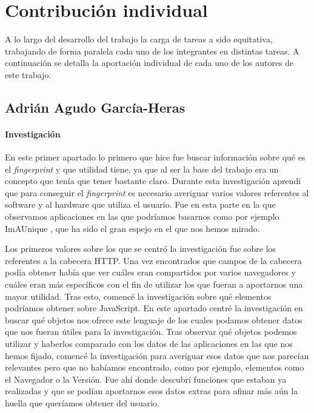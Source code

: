 \chapter{Contribución individual}
A lo largo del desarrollo del trabajo la carga de tareas a sido equitativa, trabajando de forma paralela cada uno de los integrantes en distintas tareas. A continuación se detalla la aportación individual de cada uno de los autores de este trabajo.
\section{Adrián Agudo García-Heras}
\subsubsection{Investigación}
En este primer apartado lo primero que hice fue buscar información sobre qué es el \textit{fingerprint} y que utilidad tiene, ya que al ser la base del trabajo era un concepto que tenía que tener bastante claro. Durante esta investigación aprendí que para conseguir el \textit{fingerprint} es necesario averiguar varios valores referentes al software y al hardware que utiliza el usuario. Fue en esta parte en la que observamos aplicaciones en las que podríamos basarnos como por ejemplo ImAUnique \cite{amiunique}, que ha sido el gran espejo en el que nos hemos mirado. \par
Los primeros valores sobre los que se centró la investigación fue sobre los referentes a la cabecera HTTP. Una vez encontrados que campos de la cabecera podía obtener había que ver cuáles eran compartidos por varios navegadores y cuáles eran más específicos con el fin de utilizar los que fueran a aportarnos una mayor utilidad.
Tras esto, comencé la investigación sobre qué elementos podríamos obtener sobre JavaScript. En este apartado centré la investigación en buscar qué objetos nos ofrece este lenguaje de los cuales podamos obtener datos que nos fueran útiles para la investigación. Tras observar qué objetos podemos utilizar y haberlos comparado con los datos de las aplicaciones en las que nos hemos fijado, comencé la investigación para averiguar esos datos que nos parecían relevantes pero que no habíamos encontrado, como por ejemplo, elementos como el Navegador o la Versión. Fue ahí donde descubrí funciones que estaban ya realizadas y que se podían aportarnos esos datos extras para afinar más aún la huella que queríamos obtener del usuario.

